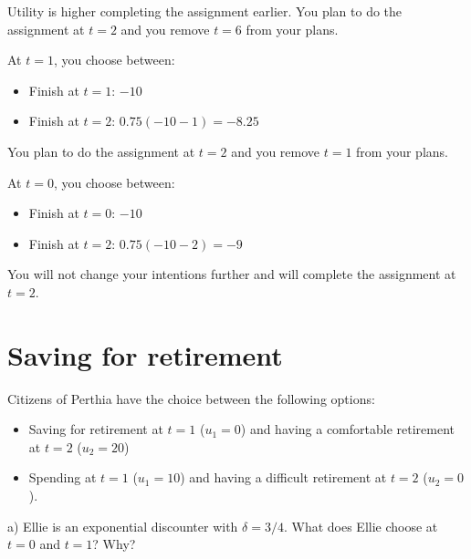 \documentclass[
  letterpaper,
  DIV=11,
  numbers=noendperiod]{scrreprt}
\providecommand{\tightlist}{%
  \setlength{\itemsep}{0pt}\setlength{\parskip}{0pt}}\usepackage{longtable,booktabs,array}
\begin{document}
\begin{tcolorbox}
Utility is higher completing the assignment earlier. You plan to do the
assignment at \(t=2\) and you remove \(t=6\) from your plans.

At \(t=1\), you choose between:

\begin{itemize}
\tightlist
\item
  Finish at \(t=1\): \(-10\)
\item
  Finish at \(t=2\): \(0.75(-10-1)=-8.25\)
\end{itemize}

You plan to do the assignment at \(t=2\) and you remove \(t=1\) from
your plans.

At \(t=0\), you choose between:

\begin{itemize}
\tightlist
\item
  Finish at \(t=0\): \(-10\)
\item
  Finish at \(t=2\): \(0.75(-10-2)=-9\)
\end{itemize}

You will not change your intentions further and will complete the
assignment at \(t=2\).

\end{tcolorbox}

\hypertarget{saving-for-retirement}{%
\section{Saving for retirement}\label{saving-for-retirement}}

Citizens of Perthia have the choice between the following options:

\begin{itemize}
\tightlist
\item
  Saving for retirement at \(t=1\) (\(u_1=0\)) and having a comfortable
  retirement at \(t=2\) (\(u_2=20\))
\item
  Spending at \(t=1\) (\(u_1=10\)) and having a difficult retirement at
  \(t=2\) (\(u_2=0\)).
\end{itemize}

a) Ellie is an exponential discounter with \(\delta=3/4\). What does
Ellie choose at \(t=0\) and \(t=1\)? Why?
\end{document}
